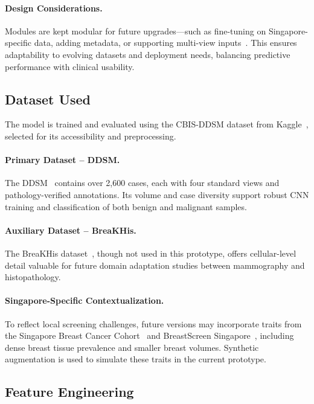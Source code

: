 \documentclass[12pt]{article}
\begin{document}
\paragraph{Design Considerations.}
Modules are kept modular for future upgrades—such as fine-tuning on Singapore-specific data, adding metadata, or supporting multi-view inputs~\cite{8}. This ensures adaptability to evolving datasets and deployment needs, balancing predictive performance with clinical usability.

\subsection{Dataset Used}

The model is trained and evaluated using the CBIS-DDSM dataset from Kaggle~\cite{cbis_ddsm_kaggle}, selected for its accessibility and preprocessing.

\paragraph{Primary Dataset – DDSM.}
The DDSM~\cite{17} contains over 2,600 cases, each with four standard views and pathology-verified annotations. Its volume and case diversity support robust CNN training and classification of both benign and malignant samples.

\paragraph{Auxiliary Dataset – BreaKHis.}
The BreaKHis dataset~\cite{18}, though not used in this prototype, offers cellular-level detail valuable for future domain adaptation studies between mammography and histopathology.

\paragraph{Singapore-Specific Contextualization.}
To reflect local screening challenges, future versions may incorporate traits from the Singapore Breast Cancer Cohort~\cite{6} and BreastScreen Singapore~\cite{19}, including dense breast tissue prevalence and smaller breast volumes. Synthetic augmentation is used to simulate these traits in the current prototype.

\subsection{Feature Engineering}
\label{subsection:Feature Engineering}
\end{document}
